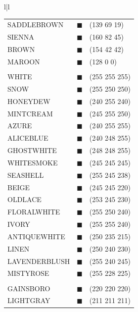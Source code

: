 \begin{table}[t]
{\begin{center}
\begin{tabular}{l|l}
\begin{tabular}{lll}
SADDLEBROWN			& {\color[RGB]{139,69,19}$\blacksquare$}	& (139 69 19)	\\
SIENNA				& {\color[RGB]{160,82,45}$\blacksquare$}	& (160 82 45)	\\
BROWN				& {\color[RGB]{154,42,42}$\blacksquare$}	& (154 42 42)	\\
MAROON				& {\color[RGB]{128,0,0}$\blacksquare$}	& (128 0 0)	\\
\\
WHITE				& {\color[RGB]{255,255,255}$\blacksquare$}	& (255 255 255)	\\
SNOW				& {\color[RGB]{255,250,250}$\blacksquare$}	& (255 250 250)	\\
HONEYDEW			& {\color[RGB]{240,255,240}$\blacksquare$}	& (240 255 240)	\\
MINTCREAM			& {\color[RGB]{245,255,250}$\blacksquare$}	& (245 255 250)	\\
AZURE				& {\color[RGB]{240,255,255}$\blacksquare$}	& (240 255 255)	\\
ALICEBLUE			& {\color[RGB]{240,248,255}$\blacksquare$}	& (240 248 255)	\\
GHOSTWHITE			& {\color[RGB]{248,248,255}$\blacksquare$}	& (248 248 255)	\\
WHITESMOKE			& {\color[RGB]{245,245,245}$\blacksquare$}	& (245 245 245)	\\
SEASHELL			& {\color[RGB]{255,245,238}$\blacksquare$}	& (255 245 238)	\\
BEIGE				& {\color[RGB]{245,245,220}$\blacksquare$}	& (245 245 220)	\\
OLDLACE				& {\color[RGB]{253,245,230}$\blacksquare$}	& (253 245 230)	\\
FLORALWHITE			& {\color[RGB]{255,250,240}$\blacksquare$}	& (255 250 240)	\\
IVORY				& {\color[RGB]{255,255,240}$\blacksquare$}	& (255 255 240)	\\
ANTIQUEWHITE		& {\color[RGB]{250,235,215}$\blacksquare$}	& (250 235 215)	\\
LINEN				& {\color[RGB]{250,240,230}$\blacksquare$}	& (250 240 230)	\\
LAVENDERBLUSH		& {\color[RGB]{255,240,245}$\blacksquare$}	& (255 240 245)	\\
MISTYROSE			& {\color[RGB]{255,228,225}$\blacksquare$}	& (255 228 225)	\\
\\
GAINSBORO			& {\color[RGB]{220,220,220}$\blacksquare$}	& (220 220 220)	\\
LIGHTGRAY			& {\color[RGB]{211,211,211}$\blacksquare$}	& (211 211 211)	\\

\end{tabular}
\end{tabular}
\end{center}}
\end{table}
